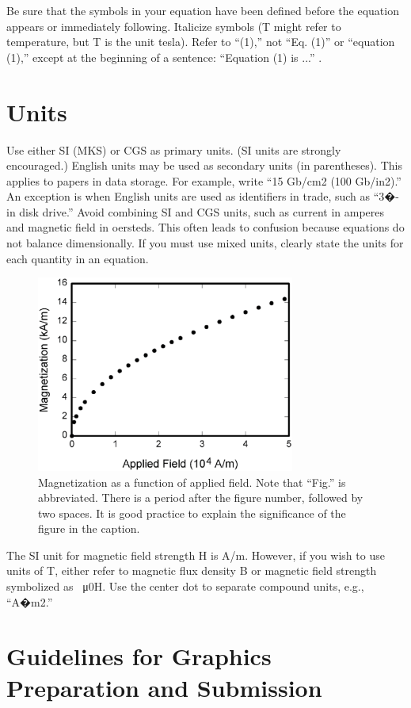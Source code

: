 \documentclass[journal]{IEEEtranTIE}
\begin{document}
Be sure that the symbols in your equation have been defined before the equation appears or immediately following. Italicize symbols (T might refer to temperature, but T is the unit tesla). Refer to ``(1),'' not ``Eq. (1)'' or ``equation (1),'' except at the beginning of a sentence: ``Equation (1) is ...'' .

\section{Units}

Use either SI (MKS) or CGS as primary units. (SI units are strongly encouraged.) English units may be used as secondary units (in parentheses). This applies to papers in data storage. For example, write ``15 Gb/cm2 (100 Gb/in2).'' An exception is when English units are used as identifiers in trade, such as ``3�-in disk drive.'' Avoid combining SI and CGS units, such as current in amperes and magnetic field in oersteds. This often leads to confusion because equations do not balance dimensionally. If you must use mixed units, clearly state the units for each quantity in an equation.


\begin{figure}[!t]\centering
	\includegraphics[width=8.5cm]{FIG1.eps}
	\caption{Magnetization as a function of applied field. Note that ``Fig.'' is abbreviated. There is a period after the figure number, followed by two spaces. It is good practice to explain the significance of the figure in the caption.}\label{FIG_1}
\end{figure}


The SI unit for magnetic field strength H is A/m. However, if you wish to use units of T, either refer to magnetic flux density B or magnetic field strength symbolized as \SI{}{\micro0H}. Use the center dot to separate compound units, e.g., ``A�m2.''

\section{Guidelines for Graphics Preparation and Submission}
\end{document}
